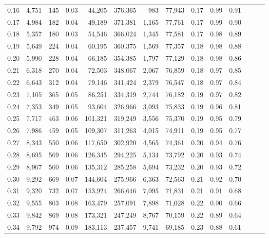 \begin{tabular}{rrrrrrrrrrrrrr}
0.16 &  4,751 &    145 &  0.03 &   44,205 &  376,365 &     983 &  77,943 &  0.17 &  0.99 &      0.91 \\
0.17 &  4,984 &    182 &  0.04 &   49,189 &  371,381 &   1,165 &  77,761 &  0.17 &  0.99 &      0.90 \\
0.18 &  5,357 &    180 &  0.03 &   54,546 &  366,024 &   1,345 &  77,581 &  0.17 &  0.98 &      0.89 \\
0.19 &  5,649 &    224 &  0.04 &   60,195 &  360,375 &   1,569 &  77,357 &  0.18 &  0.98 &      0.88 \\
0.20 &  5,990 &    228 &  0.04 &   66,185 &  354,385 &   1,797 &  77,129 &  0.18 &  0.98 &      0.86 \\
0.21 &  6,318 &    270 &  0.04 &   72,503 &  348,067 &   2,067 &  76,859 &  0.18 &  0.97 &      0.85 \\
0.22 &  6,643 &    312 &  0.04 &   79,146 &  341,424 &   2,379 &  76,547 &  0.18 &  0.97 &      0.84 \\
0.23 &  7,105 &    365 &  0.05 &   86,251 &  334,319 &   2,744 &  76,182 &  0.19 &  0.97 &      0.82 \\
0.24 &  7,353 &    349 &  0.05 &   93,604 &  326,966 &   3,093 &  75,833 &  0.19 &  0.96 &      0.81 \\
0.25 &  7,717 &    463 &  0.06 &  101,321 &  319,249 &   3,556 &  75,370 &  0.19 &  0.95 &      0.79 \\
0.26 &  7,986 &    459 &  0.05 &  109,307 &  311,263 &   4,015 &  74,911 &  0.19 &  0.95 &      0.77 \\
0.27 &  8,343 &    550 &  0.06 &  117,650 &  302,920 &   4,565 &  74,361 &  0.20 &  0.94 &      0.76 \\
0.28 &  8,695 &    569 &  0.06 &  126,345 &  294,225 &   5,134 &  73,792 &  0.20 &  0.93 &      0.74 \\
0.29 &  8,967 &    560 &  0.06 &  135,312 &  285,258 &   5,694 &  73,232 &  0.20 &  0.93 &      0.72 \\
0.30 &  9,292 &    669 &  0.07 &  144,604 &  275,966 &   6,363 &  72,563 &  0.21 &  0.92 &      0.70 \\
0.31 &  9,320 &    732 &  0.07 &  153,924 &  266,646 &   7,095 &  71,831 &  0.21 &  0.91 &      0.68 \\
0.32 &  9,555 &    803 &  0.08 &  163,479 &  257,091 &   7,898 &  71,028 &  0.22 &  0.90 &      0.66 \\
0.33 &  9,842 &    869 &  0.08 &  173,321 &  247,249 &   8,767 &  70,159 &  0.22 &  0.89 &      0.64 \\
0.34 &  9,792 &    974 &  0.09 &  183,113 &  237,457 &   9,741 &  69,185 &  0.23 &  0.88 &      0.61 \\

\end{tabular}
